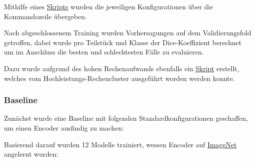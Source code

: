 Mithilfe eines \href{https://github.com/vitoleonardo/HealthyOrganTracker/blob/main/jobscript/job}{Skripts} wurden die jeweiligen Konfigurationen über die Kommandozeile übergeben. 

Nach abgeschlossenem Training wurden Vorhersagungen auf dem Validierungsfold getroffen, dabei wurde pro Teilstück und Klasse der Dice-Koeffizient berechnet um im Anschluss die besten und schlechtesten Fälle zu evaluieren.

Dazu wurde aufgrund des hohen Rechenaufwands ebenfalls ein \href{https://github.com/vitoleonardo/HealthyOrganTracker/blob/673a743c99af3771f88289eca6db33ab7d1bfe48/hpc_train_files/util/getperformance.py}{Skript} erstellt, welches vom Hochleistungs-Rechencluster ausgeführt worden werden konnte. 

\subsubsection{Baseline}

Zunächst wurde eine Baseline mit folgenden Standardkonfigurationen geschaffen, um einen Encoder ausfindig zu machen:

\begin{table}[H]
\centering
{}
\caption{\label{tab:widgets}Baseline Einstellungen}
\end{table}

Basierend darauf wurden 12 Modelle trainiert, wessen Encoder auf
\href{https://www.image-net.org/}{ImageNet} angelernt wurden:

